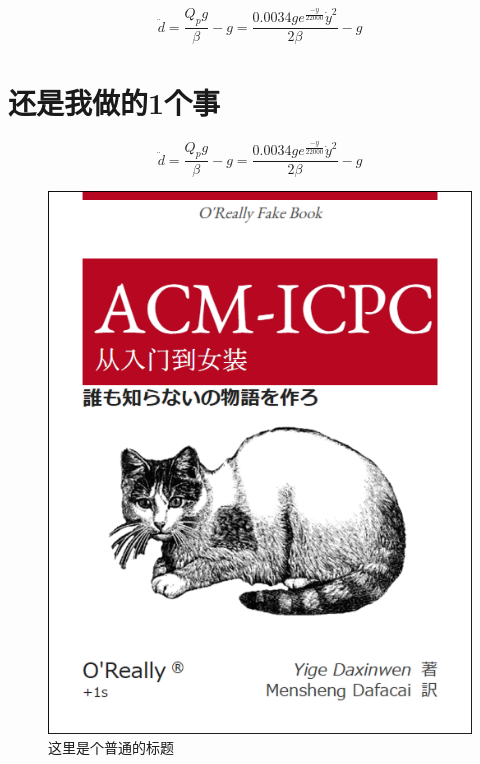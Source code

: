 \begin{equation}
\ddot{d}=\frac{Q_{p}g}{\beta}-g=\frac{0.0034ge^{\frac{-y}{22000}} \dot{y}^{2}}{2\beta}-g \label{4}
\end{equation}

\section{还是我做的1个事}

\begin{equation}
\ddot{d}=\frac{Q_{p}g}{\beta}-g=\frac{0.0034ge^{\frac{-y}{22000}} \dot{y}^{2}}{2\beta}-g \label{4}
\end{equation}

\begin{figure}[ht]
    \centering
    \includegraphics[scale=0.6]{figures/figure1.png}
    \caption{
        这里是个普通的标题
    }
    \label{fig:example}
\end{figure}
\endinput